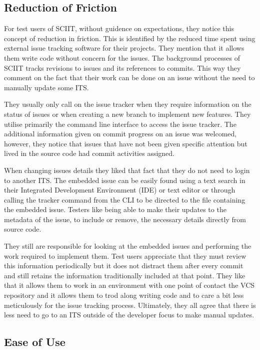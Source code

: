 \documentclass{mproj}
\begin{document}
\subsection{Reduction of Friction}

For test users of SCIIT, without guidence on expectations, they notice this concept of reduction in friction. This is identified by the reduced time spent using external issue tracking software for their projects. They mention that it allows them write code without concern for the issues. The background processes of SCIIT tracks revisions to issues and its references to commits. This way they comment on the fact that their work can be done on an issue without the need to manually update some ITS.

They usually only call on the issue tracker when they require information on the status of issues or when creating a new branch to implement new features. They utilise primarily the command line interface to access the issue tracker. The additional information given on commit progress on an issue was welcomed, however, they notice that issues that have not been given specific attention but lived in the source code had commit activities assigned.

When changing issues details they liked that fact that they do not need to login to another ITS. The embedded issue can be easily found using a text search in their Integrated Development Environment (IDE) or text editor or through calling the tracker command from the CLI to be directed to the file containing the embedded issue. Testers like being able to make their updates to the metadata of the issue, to include or remove, the necessary details directly from source code.

They still are responsible for looking at the embedded issues and performing the work required to implement them. Test users appreciate that they must review this information periodically but it does not distract them after every commit and still retains the information traditionally included at that point. They like that it allows them to work in an environment with one point of contact the VCS repository and it allows them to trod along writing code and to care a bit less meticulously for the issue tracking process. Ultimately, they all agree that there is less need to go to an ITS outside of the developer focus to make manual updates.

\subsection{Ease of Use}
\end{document}
